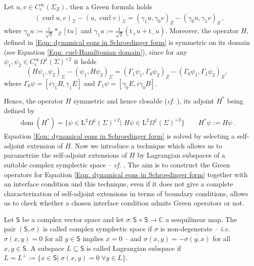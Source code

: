 \begin{proposition}\label{Prop: Curl and H Green formula}
	Let $u,v\in C^\infty_\mathrm{c}(\Sigma_Z)$, then a Green formula holds
	\begin{align}
	&(\operatorname{curl}u,v)_\Sigma-(u,\operatorname{curl}v)_\Sigma=
	(\gamma_1u,\gamma_0v)_Z-(\gamma_0u,\gamma_1v)_Z\,,
	\end{align}
	where $\gamma_0u:=\frac{1}{\sqrt{2}}\ast_Z[\mathrm{t}u]$ and
	$\gamma_1u:=\frac{1}{\sqrt{2}}(\mathrm{t}_+u+\mathrm{t}_-u)$. Moreover, the operator $H$, defined in \eqref{Eqn: dynamical eqns in Schroedinger form} is symmetric on its domain (see Equation \eqref{Eqn: curl-Hamiltonian domain}), since for any $\psi_1,\psi_2\in C^\infty_\mathrm{c}\Omega^1(\Sigma)^{\times 2}$ it holds
	\begin{equation}
		(H\psi_1,\psi_2)_\Sigma-(\psi_1,H\psi_2)_\Sigma=(\Gamma_1\psi_1,\Gamma_0\psi_2)_Z-(\Gamma_0\psi_1,\Gamma_1\psi_2)_Z,
	\end{equation}
	where $\Gamma_0\psi=\left[i\gamma_1 B,\gamma_1 E\right]$ and $\Gamma_1\psi=\left[\gamma_0 E,i\gamma_0 B\right]$.
\end{proposition}
\noindent Hence, the operator $H$ symmetric and hence closable (\emph{cf.} \cite[Thm. 5.10]{Moretti-18}), its adjoint $H^*$ being defined by
\begin{align}\label{Eqn: adjoint curl-Hamiltonian}
	\operatorname{dom}(H^*)=\lbrace
	\psi\in\mathrm{L}^2\Omega^1(\Sigma)^{\times 2}|\;H\psi\in\mathrm{L}^2\Omega^1(\Sigma)^{\times 2}\rbrace\qquad
	H^*\psi:=H\psi\,.
\end{align}
Equation \eqref{Eqn: dynamical eqns in Schroedinger form} is solved by selecting a self-adjoint extension of $H$.
Now we introduce a technique which allows us to parametrize the self-adjoint extensions of $H$ by Lagrangian subspaces of a suitable complex symplectic space -- \emph{cf.} \cite{Everitt-Markus-99,Everitt-Markus-03,Everitt-Markus-05}. The aim is to construct the Green operators for Equation \eqref{Eqn: dynamical eqns in Schroedinger form} together with an interface condition and this technique, even if it does not give a complete characterization of self-adjoint extensions in terms of boundary conditions, allows us to check whether a chosen interface condition admits Green operators or not.
\begin{Definition}\label{Def: complex symplectic space, Lagrangian subspaces}
	Let $\mathsf{S}$ be a complex vector space and let $\sigma\colon\mathsf{S}\times\mathsf{S}\to\mathbb{C}$ a sesquilinear map.
	The pair $(\mathsf{S},\sigma)$ is called complex symplectic space if $\sigma$ is non-degenerate -- \textit{i.e.} $\sigma(x,y)=0$ for all $y\in\mathsf{S}$ implies $x=0$ -- and $\sigma(x,y)=-\overline{\sigma(y,x)}$ for all $x,y\in\mathsf{S}$.
	A subspace $L\subseteq\mathsf{S}$ is called Lagrangian subspace if $L=L^\perp:=\lbrace x\in\mathsf{S}|\;\sigma(x,y)=0\;\forall y\in L\rbrace$.
\end{Definition}

